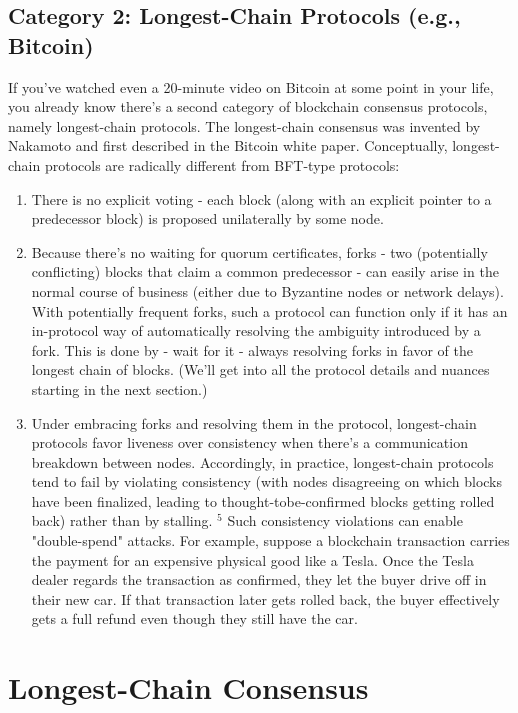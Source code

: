\subsection{Category 2: Longest-Chain Protocols (e.g., Bitcoin)}
If you've watched even a 20-minute video on Bitcoin at some point in your life, you already
know there’s a second category of blockchain consensus protocols, namely longest-chain
protocols. The longest-chain consensus was invented by Nakamoto and first described in the
Bitcoin white paper.
Conceptually, longest-chain protocols are radically different from BFT-type protocols:
\begin{enumerate}
    \item There is no explicit voting - each block (along with an explicit pointer to a predecessor block) is proposed unilaterally by some node.
    \item Because there's no waiting for quorum certificates, forks - two (potentially conflicting) blocks that claim a common predecessor - can easily arise in the normal course of business (either due to Byzantine nodes or network delays). With potentially frequent forks, such a protocol can function only if it has an in-protocol way of automatically resolving the ambiguity introduced by a fork. This is done by - wait for it - always resolving forks in favor of the longest chain of blocks. (We'll get into all the protocol details and nuances starting in the next section.)
    \item Under embracing forks and resolving them in the protocol, longest-chain protocols favor liveness over consistency when there's a communication breakdown between nodes. Accordingly, in practice, longest-chain protocols tend to fail by violating consistency (with nodes disagreeing on which blocks have been finalized, leading to thought-tobe-confirmed blocks getting rolled back) rather than by stalling. ${ }^{5}$ Such consistency violations can enable "double-spend" attacks. For example, suppose a blockchain transaction carries the payment for an expensive physical good like a Tesla. Once the Tesla dealer regards the transaction as confirmed, they let the buyer drive off in their new car. If that transaction later gets rolled back, the buyer effectively gets a full refund even though they still have the car.
\end{enumerate}


\section{Longest-Chain Consensus}
